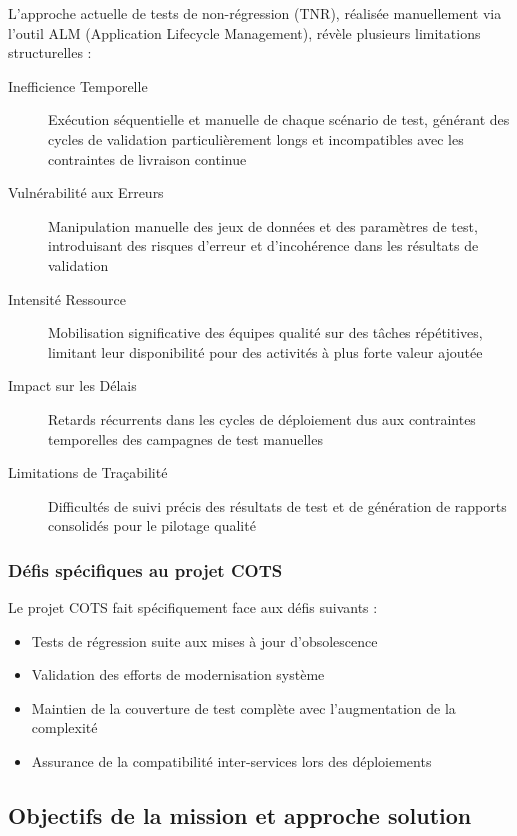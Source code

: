 L'approche actuelle de tests de non-régression (TNR), réalisée manuellement via l'outil ALM (Application Lifecycle Management), révèle plusieurs limitations structurelles :

\begin{description}
    \item[Inefficience Temporelle] Exécution séquentielle et manuelle de chaque scénario de test, générant des cycles de validation particulièrement longs et incompatibles avec les contraintes de livraison continue
    \item[Vulnérabilité aux Erreurs] Manipulation manuelle des jeux de données et des paramètres de test, introduisant des risques d'erreur et d'incohérence dans les résultats de validation
    \item[Intensité Ressource] Mobilisation significative des équipes qualité sur des tâches répétitives, limitant leur disponibilité pour des activités à plus forte valeur ajoutée
    \item[Impact sur les Délais] Retards récurrents dans les cycles de déploiement dus aux contraintes temporelles des campagnes de test manuelles
    \item[Limitations de Traçabilité] Difficultés de suivi précis des résultats de test et de génération de rapports consolidés pour le pilotage qualité
\end{description}

\subsubsection{Défis spécifiques au projet COTS}

Le projet COTS fait spécifiquement face aux défis suivants :
\begin{itemize}
    \item Tests de régression suite aux mises à jour d'obsolescence
    \item Validation des efforts de modernisation système
    \item Maintien de la couverture de test complète avec l'augmentation de la complexité
    \item Assurance de la compatibilité inter-services lors des déploiements
\end{itemize}

\subsection{Objectifs de la mission et approche solution}

